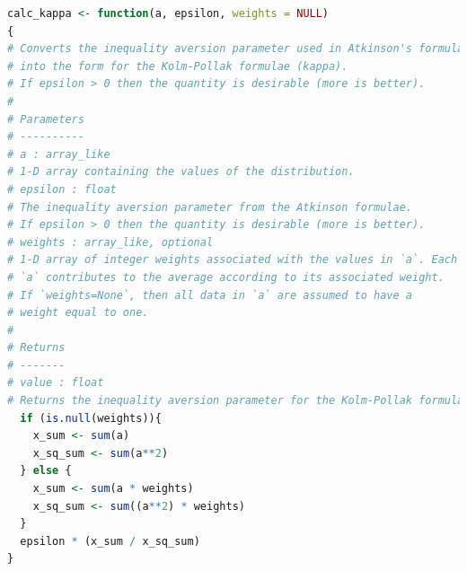 \documentclass[final,3p,times,onecolumn,sort&compress]{elsarticle}
\begin{document}
\begin{lstlisting}[language=R]
calc_kappa <- function(a, epsilon, weights = NULL)
{
# Converts the inequality aversion parameter used in Atkinson's formulae (epsilon)
# into the form for the Kolm-Pollak formulae (kappa).
# If epsilon > 0 then the quantity is desirable (more is better).
#
# Parameters
# ----------
# a : array_like
# 1-D array containing the values of the distribution.
# epsilon : float
# The inequality aversion parameter from the Atkinson formulae.
# If epsilon > 0 then the quantity is desirable (more is better).
# weights : array_like, optional
# 1-D array of integer weights associated with the values in `a`. Each value in
# `a` contributes to the average according to its associated weight.
# If `weights=None`, then all data in `a` are assumed to have a
# weight equal to one.
#
# Returns
# -------
# value : float
# Returns the inequality aversion parameter for the Kolm-Pollak formulae
  if (is.null(weights)){
    x_sum <- sum(a)
    x_sq_sum <- sum(a**2)
  } else {
    x_sum <- sum(a * weights)
    x_sq_sum <- sum((a**2) * weights)
  }
  epsilon * (x_sum / x_sq_sum)
}

\end{lstlisting}
\end{document}
